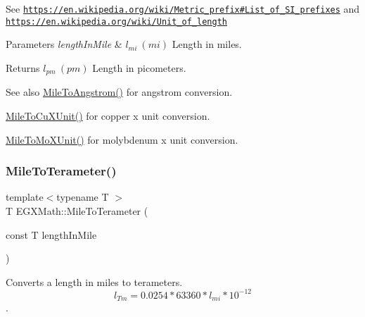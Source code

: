See \href{https://en.wikipedia.org/wiki/Metric_prefix#List_of_SI_prefixes}{\tt https\+://en.\+wikipedia.\+org/wiki/\+Metric\+\_\+prefix\#\+List\+\_\+of\+\_\+\+S\+I\+\_\+prefixes} and \href{https://en.wikipedia.org/wiki/Unit_of_length}{\tt https\+://en.\+wikipedia.\+org/wiki/\+Unit\+\_\+of\+\_\+length} 
\begin{DoxyParams}{Parameters}
{\em length\+In\+Mile} & $ l_{mi}\ (mi)$ Length in miles. \\
\hline
\end{DoxyParams}
\begin{DoxyReturn}{Returns}
$ l_{pm}\ (pm)$ Length in picometers. 
\end{DoxyReturn}
\begin{DoxySeeAlso}{See also}
\mbox{\hyperlink{group___e_g_x_math-_conversions-_length_conversions-_imperial-_mile-_non-_s_i_ga291d6035f59be619459011941676f7c7}{Mile\+To\+Angstrom()}} for angstrom conversion. 

\mbox{\hyperlink{group___e_g_x_math-_conversions-_length_conversions-_imperial-_mile-_non-_s_i_ga63bec635d857da530046d1c5a165b1d8}{Mile\+To\+Cu\+X\+Unit()}} for copper x unit conversion. 

\mbox{\hyperlink{group___e_g_x_math-_conversions-_length_conversions-_imperial-_mile-_non-_s_i_gadefb09bf42157adb9c7a458b93e3a851}{Mile\+To\+Mo\+X\+Unit()}} for molybdenum x unit conversion. 
\end{DoxySeeAlso}
\mbox{\label{group___e_g_x_math-_conversions-_length_conversions-_imperial-_mile-_s_i_gaebf59d9cdca70b0714a8740790cbe355}} 
\subsubsection{\texorpdfstring{Mile\+To\+Terameter()}{MileToTerameter()}}
{\footnotesize\ttfamily template$<$typename T $>$ \\
T E\+G\+X\+Math\+::\+Mile\+To\+Terameter (\begin{DoxyParamCaption}\item[{const T}]{length\+In\+Mile }\end{DoxyParamCaption})}



Converts a length in miles to terameters. \[ l_{Tm}=0.0254 * 63360 * l_{mi} * 10^{-12} \]. 

